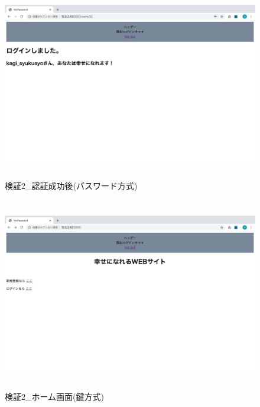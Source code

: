     \vspace{4cm}%
    \begin{figure}[H]
        \includegraphics[height=8.4cm]{./fig/chapter4/inspect_2/password_screnn/success.png}
        \caption{検証2\_認証成功後(パスワード方式)}
        \label{検証２認証成功後(パスワード方式)}
    \end{figure}

    \vspace{4cm}%
    \begin{figure}[H]
        \includegraphics[height=8.4cm]{./fig/chapter4/inspect_2/key_screnn/home.png}
        \caption{検証2\_ホーム画面(鍵方式)}
        \label{検証２ホーム画面(鍵方式)}
    \end{figure}

